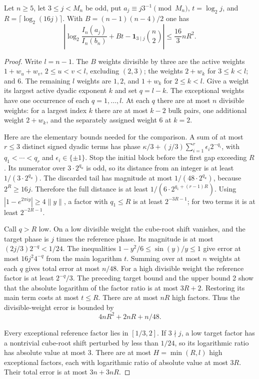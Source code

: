 \begin{lemma}
Let $n\ge5$, let $3\le j<M_n$ be odd, put
$a_j\equiv j3^{-1}\pmod{M_n}$, $t=\log_2j$, and
$R=\lceil\log_2(16j)\rceil$.  With
$B=(n-1)(n-4)/2$ one has
\[
 \left|\log_2\frac{I_n(a_j)}{I_n(b_n)}
        +Bt-\mathbf1_{3\mid j}\binom n2\right|
              \le \frac{16}{3}nR^2.
 \tag{PNEW-near}
\]
\end{lemma}
\begin{proof}
Write $l=n-1$.  The $B$ weights divisible by three are the active
weights $1+w_u+w_v$, $2\le u<v<l$, excluding $(2,3)$; the weights
$2+w_k$ for $3\le k<l$; and 6.  The remaining $l$ weights are
$1,2$, and $1+w_k$ for $2\le k<l$.  Give a weight its largest
active dyadic exponent $k$ and set $q=l-k$.  The exceptional
weights have one occurrence of each $q=1,\ldots,l$.
At each $q$ there are at most $n$ divisible weights: for a largest
index $k$ there are at most $k-2$ bulk pairs, one additional weight
$2+w_k$, and the separately assigned weight 6 at $k=2$.

Here are the elementary bounds needed for the comparison.  A sum
of at most $r\le3$ distinct signed dyadic terms has phase
$\kappa/3+(j/3)\sum_{i=1}^r\epsilon_i2^{-q_i}$, with
$q_1<\cdots<q_r$ and $\epsilon_i\in\{\pm1\}$.  Stop the initial
block before the first gap exceeding $R$.  Its numerator over
$3\cdot2^{q_u}$ is odd, so its distance from an integer is at least
$1/(3\cdot2^{q_u})$.  The discarded tail has magnitude at most
$1/(48\cdot2^{q_u})$, because $2^R\ge16j$.  Therefore the full
distance is at least $1/(6\cdot2^{q_1+(r-1)R})$.
Using $|1-e^{2\pi iy}|\ge4\|y\|$, a factor with $q_1\le R$ is
at least $2^{-3R-1}$; for two terms it is at least $2^{-2R-1}$.

Call $q>R$ low.  On a low divisible weight the cube-root shift
vanishes, and the target phase is $j$ times the reference phase.
Its magnitude is at most $(2j/3)2^{-q}<1/24$.
The inequalities $1-y^2/6\le\sin(y)/y\le1$ give error at most
$16j^2 4^{-q}$ from the main logarithm $t$.  Summing over at most
$n$ weights at each $q$ gives total error at most $n/48$.
For a high divisible weight the reference factor is at least
$2^{-q}/3$.  The preceding target bound and the upper bound 2
show that the absolute logarithm of the factor ratio is at most
$3R+2$.  Restoring its main term costs at most $t\le R$.
There are at most $nR$ high factors.  Thus the divisible-weight
error is bounded by
\[
                        4nR^2+2nR+n/48.
\]

Every exceptional reference factor lies in $[1/3,2]$.  If
$3\nmid j$, a low target factor has a nontrivial cube-root shift
perturbed by less than $1/24$, so its logarithmic ratio has
absolute value at most 3.  There are at most
$H=\min(R,l)$ high exceptional factors, each with logarithmic
ratio of absolute value at most $3R$.  Their total error is at
most $3n+3nR$.


\end{proof}
